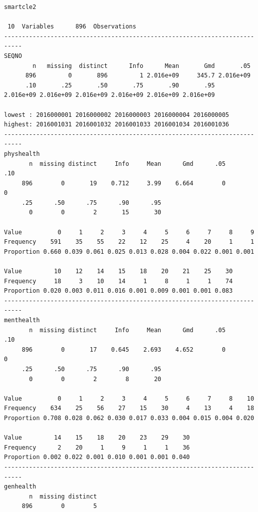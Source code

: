 \documentclass[]{book}
\theoremstyle{definition}
\theoremstyle{definition}
\theoremstyle{definition}
\theoremstyle{remark}
\begin{document}
\begin{verbatim}
smartcle2 

 10  Variables      896  Observations
---------------------------------------------------------------------------
SEQNO 
        n   missing  distinct      Info      Mean       Gmd       .05 
      896         0       896         1 2.016e+09     345.7 2.016e+09 
      .10       .25       .50       .75       .90       .95 
2.016e+09 2.016e+09 2.016e+09 2.016e+09 2.016e+09 2.016e+09 

lowest : 2016000001 2016000002 2016000003 2016000004 2016000005
highest: 2016001031 2016001032 2016001033 2016001034 2016001036
---------------------------------------------------------------------------
physhealth 
       n  missing distinct     Info     Mean      Gmd      .05      .10 
     896        0       19    0.712     3.99    6.664        0        0 
     .25      .50      .75      .90      .95 
       0        0        2       15       30 
                                                                      
Value          0     1     2     3     4     5     6     7     8     9
Frequency    591    35    55    22    12    25     4    20     1     1
Proportion 0.660 0.039 0.061 0.025 0.013 0.028 0.004 0.022 0.001 0.001
                                                                
Value         10    12    14    15    18    20    21    25    30
Frequency     18     3    10    14     1     8     1     1    74
Proportion 0.020 0.003 0.011 0.016 0.001 0.009 0.001 0.001 0.083
---------------------------------------------------------------------------
menthealth 
       n  missing distinct     Info     Mean      Gmd      .05      .10 
     896        0       17    0.645    2.693    4.652        0        0 
     .25      .50      .75      .90      .95 
       0        0        2        8       20 
                                                                      
Value          0     1     2     3     4     5     6     7     8    10
Frequency    634    25    56    27    15    30     4    13     4    18
Proportion 0.708 0.028 0.062 0.030 0.017 0.033 0.004 0.015 0.004 0.020
                                                    
Value         14    15    18    20    23    29    30
Frequency      2    20     1     9     1     1    36
Proportion 0.002 0.022 0.001 0.010 0.001 0.001 0.040
---------------------------------------------------------------------------
genhealth 
       n  missing distinct 
     896        0        5 
                                                                      

\end{verbatim}
\end{document}
